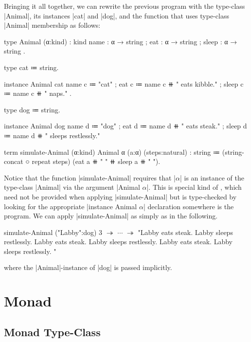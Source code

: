 \newpage
Bringing it all together, we can rewrite the previous program with the type-class {{\code|Animal|,}} its instances \code|cat| and \code|dog|, and the function that uses type-class \code|Animal| membership as follows:
%
\begin{snippet}
type Animal (α:kind) : kind
  { name  : α → string
  ; eat   : α → string
  ; sleep : α → string }.

type cat ≔ string.

instance Animal cat
  { name  c ≔ "cat"
  ; eat   c ≔ name c ⧺ " eats kibble."
  ; sleep c ≔ name c ⧺ " naps." }.

type dog ≔ string.

instance Animal dog
  { name  d ≔ "dog"
  ; eat   d ≔ name d ⧺ " eats steak."
  ; sleep d ≔ name d ⧺ " sleeps restlessly." }

term simulate-Animal (α:kind) {Animal α} (a:α) (steps:natural) : string
  ≔ (string-concat ○ repeat steps)
      (eat a ⧺ " " ⧺ sleep a ⧺ " ").
\end{snippet}
%
Notice that the function \code|simulate-Animal| requires that \code|$α$| is an instance of the type-class \code|Animal| via the argument \code|{Animal $α$}|.
This is special kind of , which need not be provided when applying \code|simulate-Animal| but is type-checked by looking for the appropriate \code|instance Animal $α$| declaration somewhere is the program.
We can apply \code|simulate-Animal| as simply as in the following.
%
\begin{snippet}
simulate-Animal ("Labby":dog) 3
$↠$ $\cdots$ $↠$
"Labby eats steak. Labby sleeps restlessly. Labby eats steak. Labby sleeps restlessly. Labby eats steak. Labby sleeps restlessly. "
\end{snippet}
where the \code|Animal|-instance of \code|dog| is passed implicitly.

\newpage
\section{Monad}
\label{sec:constructing-monads}

\subsection{Monad Type-Class}
\label{sec:monad-type-class}


